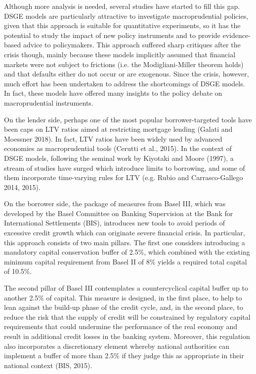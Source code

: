 \documentclass[final,3p,times,twocolumn]{elsarticle}
\begin{document}
Although more analysis is needed, several studies have started to fill this gap. DSGE models are particularly attractive to investigate macroprudential policies, given that this approach is suitable for quantitative experiments, so it has the potential to study the impact of new policy instruments and to provide evidence-based advice to policymakers. This approach suffered sharp critiques after the crisis though, mainly because these models implicitly assumed that financial markets were not subject to frictions (i.e. the Modigliani-Miller theorem holds) and that defaults either do not occur or are exogenous. Since the crisis, however, much effort has been undertaken to address the shortcomings of DSGE models. In fact, these models have offered many insights to the policy debate on macroprudential instruments.

On the lender side, perhaps one of the most popular borrower-targeted tools have been caps on LTV ratios aimed at restricting mortgage lending (Galati and Moessner 2018). In fact, LTV ratios have been widely used by advanced economies as macroprudential tools (Cerutti et al., 2015). In the context of DSGE models, following the seminal work by Kiyotaki and Moore (1997), a stream of studies have surged which introduce limits to borrowing, and some of them incorporate time-varying rules for LTV (e.g. Rubio and Carrasco-Gallego 2014, 2015).\par

On the borrower side, the package of measures from Basel III, which was developed by the Basel Committee on Banking Supervision at the Bank for International Settlements (BIS), introduces new tools to avoid periods of excessive credit growth which can originate severe financial crisis. In particular, this approach consists of two main pillars. The first one considers introducing a mandatory capital conservation buffer of 2.5\%, which combined with the existing minimum capital requirement from Basel II of 8\% yields a required total capital of 10.5\%.\par

The second pillar of Basel III contemplates a countercyclical capital buffer up to another 2.5\% of capital. This measure is designed, in the first place, to help to lean against the build-up phase of the credit cycle, and, in the second place, to reduce the risk that the supply of credit will be constrained by regulatory capital requirements that could undermine the performance of the real economy and result in additional credit losses in the banking system. Moreover, this regulation also incorporates a discretionary element whereby national authorities can implement a buffer of more than 2.5\% if they judge this as appropriate in their national context (BIS, 2015).\par
\end{document}
